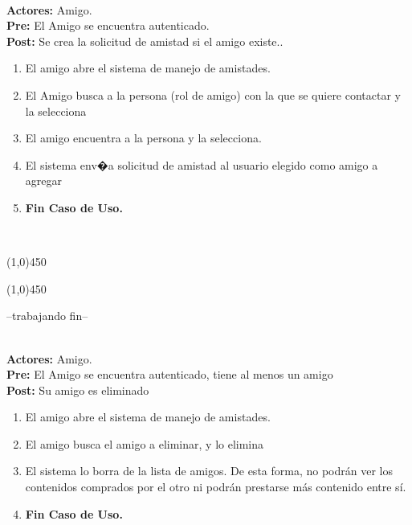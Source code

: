 \documentclass[11pt, a4paper, spanish]{article}
\begin{document}
 \\
\textbf{Actores:} Amigo. \\
\textbf{Pre:} El Amigo se encuentra autenticado. \\
\textbf{Post:} Se crea la solicitud de amistad si el amigo existe..\\
\begin{enumerate}
	\item El amigo abre el sistema de manejo de amistades.
	\item El Amigo busca a la persona (rol de amigo) con la que se quiere contactar y la selecciona
	\item El amigo encuentra a la persona y la selecciona.
	\item El sistema env�a solicitud de amistad al usuario elegido como amigo a agregar
	\item \textbf{Fin Caso de Uso.}
\end{enumerate}
 \\
\begin{center} \line(1,0){450} \end{center}
\newpage
\begin{center} \line(1,0){450} \end{center}



--trabajando fin--


	 \\
\textbf{Actores:} Amigo. \\
\textbf{Pre:} El Amigo se encuentra autenticado, tiene al menos un amigo \\
\textbf{Post:} Su amigo es eliminado\\
\begin{enumerate}
	\item El amigo abre el sistema de manejo de amistades.
\item El amigo busca el amigo a eliminar, y lo elimina	
 \item El sistema lo borra de la lista de amigos. De esta forma, no podrán ver los contenidos comprados por el otro ni podrán prestarse más contenido entre sí.
\item \textbf{Fin Caso de Uso.} \\
\end{enumerate}
\end{document}
